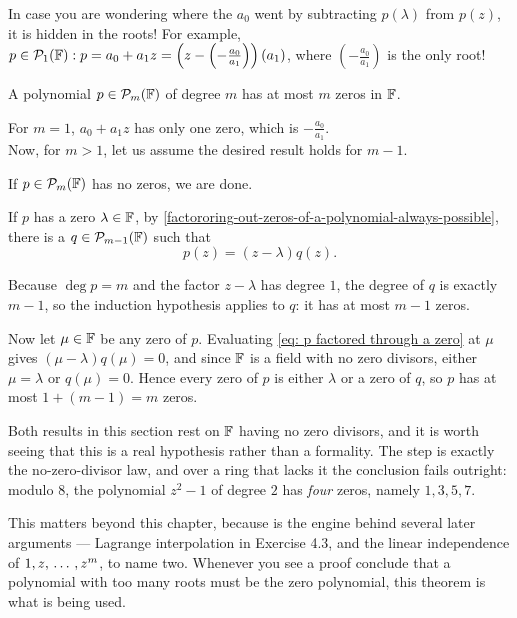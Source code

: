 In case you are wondering where the $a_0$ went by subtracting $p(\lambda)$ from $p(z)$, it is hidden in the roots! For example, $p\in \mathcal{P}_1(\mathbb{F}): p=a_0+a_1z = \left(z- \left(-\frac{a_0}{a_1}\right)\right)(a_1)$, where $\left(-\frac{a_0}{a_1}\right)$ is the only root!

\setcounter{thm}{7}
\begin{thm} 
  \label{thm: a polynomial of degree m has at most m zeros}
  A polynomial $p \in \mathcal{P}_m(\mathbb{F})$ of degree $m$ has at most $m$ zeros in $\mathbb{F}$.
\end{thm}
\begin{prf}
  For $m=1$, $a_0+a_1z$ has only one zero, which is $-\frac{a_0}{a_1}$.\\
  Now, for $m>1$, let us assume the desired result holds for $m-1$.

  If $p\in \mathcal{P}_{m}(\mathbb{F})$ has no zeros, we are done.

  If $p$ has a zero $\lambda \in \mathbb{F}$, by \ref{factororing-out-zeros-of-a-polynomial-always-possible}, there is a $q \in \mathcal{P}_{m-1}(\mathbb{F})$ such that
  \begin{equation}
    \label{eq: p factored through a zero}
  	p(z)=(z-\lambda)q(z).
  \end{equation}

  Because $\deg p = m$ and the factor $z-\lambda$ has degree $1$, the degree of $q$ is exactly $m-1$, so the induction hypothesis applies to $q$: it has at most $m-1$ zeros.

  Now let $\mu \in \mathbb{F}$ be any zero of $p$. Evaluating \eqref{eq: p factored through a zero} at $\mu$ gives $(\mu - \lambda) q(\mu) = 0$, and since $\mathbb{F}$ is a field with no zero divisors, either $\mu = \lambda$ or $q(\mu) = 0$. Hence every zero of $p$ is either $\lambda$ or a zero of $q$, so $p$ has at most $1 + (m-1) = m$ zeros.
\end{prf}

\begin{ainote}
  Both results in this section rest on $\mathbb{F}$ having no zero divisors, and it is worth seeing that this is a real hypothesis rather than a formality. The step  is exactly the no-zero-divisor law, and over a ring that lacks it the conclusion fails outright: modulo $8$, the polynomial $z^2 - 1$ of degree $2$ has \emph{four} zeros, namely $1, 3, 5, 7$.

  This matters beyond this chapter, because  is the engine behind several later arguments --- Lagrange interpolation in Exercise 4.3, and the linear independence of $1, z, {\, \ldots \,\,}, z^m$, to name two. Whenever you see a proof conclude that a polynomial with too many roots must be the zero polynomial, this theorem is what is being used.
\end{ainote}

